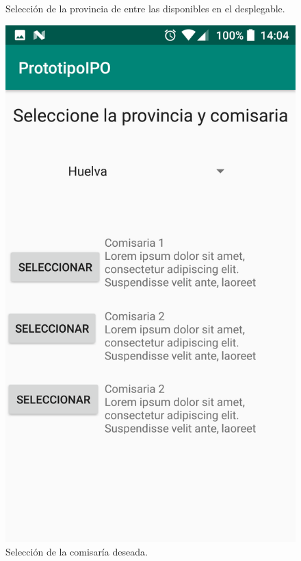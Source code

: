 \documentclass[a4paper,11pt]{article}
\begin{document}
\begin{figure}[H]
\begin{minipage}{0.45\linewidth}
\caption{Selección de la provincia de entre las disponibles en el desplegable.}
\label{provcom1}
\end{minipage}
\begin{minipage}{0.45\linewidth}
\includegraphics[width=\textwidth]{7.png}
\caption{Selección de la comisaría deseada.}
\label{provcom2}
\end{minipage}
\end{figure}
\end{document}

